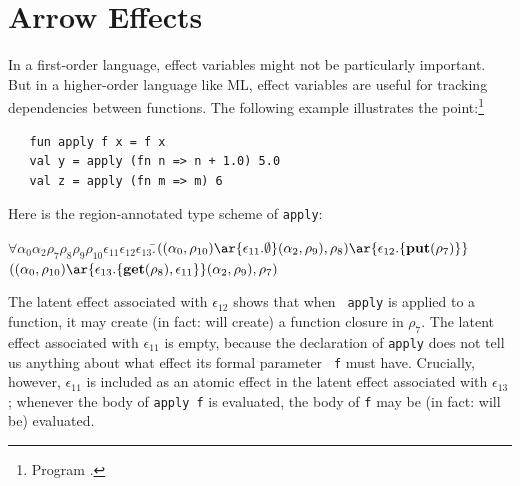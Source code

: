 \documentclass[12pt]{book}
\begin{document}
\section{Arrow Effects}
In a first-order language, effect variables might not be particularly
important.  But in a higher-order language like ML, effect variables
are useful for tracking dependencies between functions. The following
example illustrates the point:\footnote{Program
  .}
\begin{verbatim}
   fun apply f x = f x
   val y = apply (fn n => n + 1.0) 5.0
   val z = apply (fn m => m) 6
\end{verbatim}
Here is the region-annotated type scheme of {\tt apply}:
\begin{tabbing}
\qquad$\forall\alpha_0\alpha_2\rho_7\rho_8\rho_9\rho_{10}\epsilon_{11}\epsilon_{12}\epsilon_{13}.$\=$((\alpha_0,\rho_{10})
        \ar{\epsilon_{11}.\emptyset}(\alpha_2,\rho_9),\rho_8)\ar{\epsilon_{12}.\{\Put(\rho_7)\}}$\\
            \>$((\alpha_0,\rho_{10})\ar{\epsilon_{13}.\{\Get(\rho_8), \epsilon_{11}\}}(\alpha_2,\rho_9),\rho_7)$
\end{tabbing}
The latent effect associated with $\epsilon_{12}$ shows that when {\tt
  apply} is applied to a function, it may create (in fact: will
create) a function closure in $\rho_7$.  The latent effect associated
with $\epsilon_{11}$ is empty, because the declaration of {\tt apply}
does not tell us anything about what effect its formal parameter {\tt
  f} must have. Crucially, however, $\epsilon_{11}$ is included as an
atomic effect in the latent effect associated with $\epsilon_{13}$;
whenever the body of {\tt apply f} is evaluated, the body of {\tt f}
may be (in fact: will be) evaluated.
\end{document}
